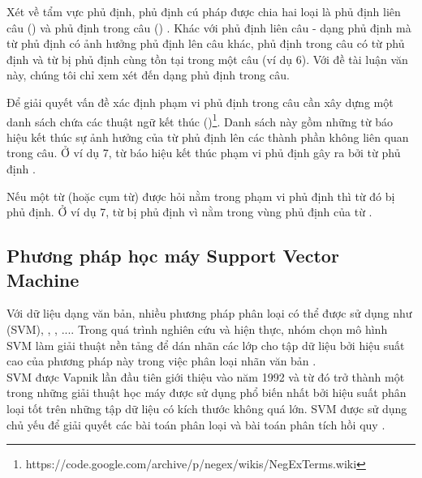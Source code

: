 Xét về tẩm vực phủ định, phủ định cú pháp được chia hai loại là phủ định liên câu () và phủ định trong câu () \cite{Councill2010}. Khác với phủ định liên câu - dạng phủ định mà từ phủ định có ảnh hưởng phủ định lên câu khác, phủ định trong câu có từ phủ định và từ bị phủ định cùng tồn tại trong một câu (ví dụ 6). Với đề tài luận văn này, chúng tôi chỉ xem xét đến dạng phủ định trong câu.


Để giải quyết vấn đề xác định phạm vi phủ định trong câu cần xây dựng một danh sách chứa các thuật ngữ kết thúc ()\footnote{https://code.google.com/archive/p/negex/wikis/NegExTerms.wiki}. Danh sách này gồm những từ báo hiệu kết thúc sự ảnh hưởng của từ phủ định lên các thành phần không liên quan trong câu. Ở ví dụ 7, từ  báo hiệu kết thúc phạm vi phủ định gây ra bởi từ phủ định .


Nếu một từ (hoặc cụm từ) được hỏi nằm trong phạm vi phủ định thì từ đó bị phủ định. Ở ví dụ 7, từ  bị phủ định vì nằm trong vùng phủ định của từ .

\subsection{Phương pháp học máy Support Vector Machine}
Với dữ liệu dạng văn bản, nhiều phương pháp phân loại có thể được sử dụng như  (SVM), , , ...\cite{manning2009anintroduction}. Trong quá trình nghiên cứu và hiện thực, nhóm chọn mô hình SVM làm giải thuật nền tảng để dán nhãn các lớp cho tập dữ liệu bởi hiệu suất cao của phương pháp này trong việc phân loại nhãn văn bản \cite{joachims1998text}.\\

SVM được Vapnik lần đầu tiên giới thiệu vào năm 1992 và từ đó trở thành một trong những giải thuật học máy được sử dụng phổ biến nhất bởi hiệu suất phân loại tốt trên những tập dữ liệu có kích thước không quá lớn. SVM được sử dụng chủ yếu để giải quyết các bài toán phân loại và bài toán phân tích hồi quy \cite{chandrakala2012opinion}\cite{manning2009anintroduction}. \\

